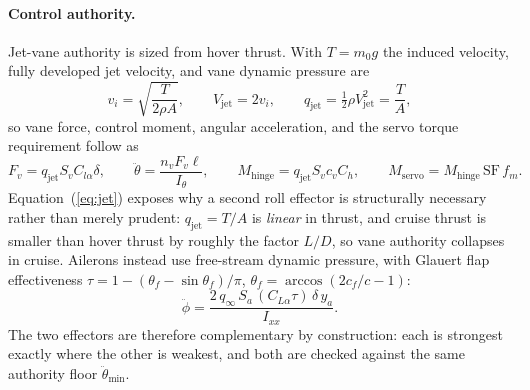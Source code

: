 \paragraph{Control authority.} Jet-vane authority is sized from hover
thrust. With $T=m_0g$ the induced velocity, fully developed jet
velocity, and vane dynamic pressure are
\begin{equation}
v_i = \sqrt{\frac{T}{2\rho A}},
\qquad V_{\mathrm{jet}} = 2v_i,
\qquad q_{\mathrm{jet}} = \tfrac{1}{2}\rho V_{\mathrm{jet}}^{2}
  = \frac{T}{A},
\label{eq:jet}
\end{equation}
so vane force, control moment, angular acceleration, and the servo
torque requirement follow as
\begin{equation}
F_v = q_{\mathrm{jet}} S_v C_{l\alpha}\delta,
\qquad
\ddot\theta = \frac{n_v F_v \ell}{I_{\theta}},
\qquad
M_{\mathrm{hinge}} = q_{\mathrm{jet}} S_v c_v C_{h},
\qquad
M_{\mathrm{servo}} = M_{\mathrm{hinge}}\,\mathrm{SF}\,f_m .
\label{eq:vane}
\end{equation}
Equation~(\ref{eq:jet}) exposes why a second roll effector is
structurally necessary rather than merely prudent: $q_{\mathrm{jet}} =
T/A$ is \emph{linear} in thrust, and cruise thrust is smaller than
hover thrust by roughly the factor $L/D$, so vane authority collapses
in cruise. Ailerons instead use free-stream dynamic pressure, with
Glauert flap effectiveness
$\tau = 1-(\theta_f-\sin\theta_f)/\pi$,
$\theta_f = \arccos(2c_f/c-1)$:
\begin{equation}
\ddot\phi = \frac{2\,q_\infty\,S_a\,(C_{L\alpha}\tau)\,\delta\,y_a}
                 {I_{xx}} .
\label{eq:aileron}
\end{equation}
The two effectors are therefore complementary by construction: each is
strongest exactly where the other is weakest, and both are checked
against the same authority floor $\ddot\theta_{\min}$.

